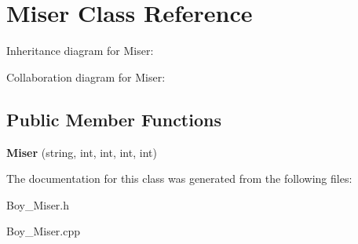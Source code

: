 \hypertarget{classMiser}{}\section{Miser Class Reference}
\label{classMiser}


Inheritance diagram for Miser\+:


Collaboration diagram for Miser\+:
\subsection*{Public Member Functions}
\begin{DoxyCompactItemize}
\item 
{\bfseries Miser} (string, int, int, int, int)\hypertarget{classMiser_a4ef6372008b543d6218b8966d470d366}{}\label{classMiser_a4ef6372008b543d6218b8966d470d366}

\end{DoxyCompactItemize}


The documentation for this class was generated from the following files\+:\begin{DoxyCompactItemize}
\item 
Boy\+\_\+\+Miser.\+h\item 
Boy\+\_\+\+Miser.\+cpp\end{DoxyCompactItemize}
